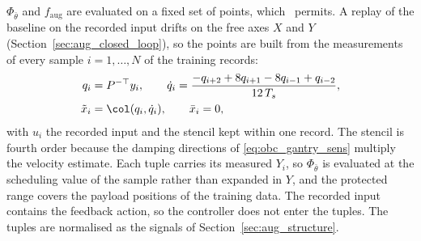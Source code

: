$\Phi_{\bar\theta}$ and $f_{\mathrm{aug}}$ are evaluated on a fixed set of
points, which~\cite[Sec.~3.2]{gyorok2026obc} permits.
A replay of the baseline on the recorded input drifts on the free axes $X$ and
$Y$ (Section~\ref{sec:aug_closed_loop}), so the points are built from the
measurements of every sample $i=1,\dots,N$ of the training records:
\begin{equation}
\begin{aligned}
 q_i&=P^{-\top}y_i,\qquad
 \dot q_i=\frac{-q_{i+2}+8q_{i+1}-8q_{i-1}+q_{i-2}}{12\,T_s},\\
 \tilde x_i&=\col(q_i,\dot q_i),\qquad \bar x_i=0,
\end{aligned}
\label{eq:obc_tuples}
\end{equation}
with $u_i$ the recorded input and the stencil kept within one record.
The stencil is fourth order because the damping directions of
\eqref{eq:obc_gantry_sens} multiply the velocity estimate.
Each tuple carries its measured $Y_i$, so $\Phi_{\bar\theta}$ is evaluated at
the scheduling value of the sample rather than expanded in $Y$, and the
protected range covers the payload positions of the training data.
The recorded input contains the feedback action, so the controller does not
enter the tuples.
The tuples are normalised as the signals of Section~\ref{sec:aug_structure}.

